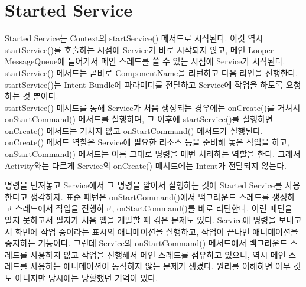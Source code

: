 \section{Started Service}
Started Service는 Context의 startService() 메서드로 시작된다. 
이것 역시 startService()를 호출하는 시점에 Service가 바로 시작되지 않고, 메인 Looper MessageQueue에 들어가서 메인 스레드를 쓸 수 있는 시점에 Service가 시작된다. 
startService() 메서드는 곧바로 ComponentName을 리턴하고 다음 라인을 진행한다. startService()는 Intent Bundle에 파라미터를 전달하고 Service에 작업을 하도록 요청하는 것 뿐이다.\\

startService() 메서드를 통해 Service가 처음 생성되는 경우에는 onCreate()를 거쳐서 onStartCommand() 메서드를 실행하며, 그 이후에 startService()를 실행하면 onCreate() 메서드는 거치지 않고 onStartCommand() 메서드가 실행된다.
onCreate() 메서드 역할은 Service에 필요한 리소스 등을 준비해 놓은 작업을 하고, onStartCommand() 메서드는 이름 그대로 명령을 매번 처리하는 역할을 한다. 그래서 Activity와는 다르게 Service의 onCreate() 메서드에는 Intent가 전달되지 않는다.\\

명령을 던져놓고 Service에서 그 명령을 알아서 실행하는 것에 Started Service를 사용한다고 생각하자.
표준 패턴은 onStartCommand()에서 백그라운드 스레드를 생성하고 
스레드에서 작업을 진행하고, onStartCommand()를 바로 리턴한다. 이런 패턴을 알지 못하고서 필자가 처음 앱을 개발할 때 겪은 문제도 있다. Service에 명령을 보내고서 화면에 작업 중이라는 표시의 애니메이션을 실행하고, 작업이 끝나면 애니메이션을 중지하는 기능이다.
그런데 Service의  onStartCommand() 메서드에서 백그라운드 스레드를 사용하지 않고 작업을 진행해서 메인 스레드를 점유하고 있으니, 역시 메인 스레드를 사용하는 애니메이션이 동작하지 않는 문제가 생겼다. 원리를 이해하면 아무 것도 아니지만 당시에는 당황했던 기억이 있다.\\

